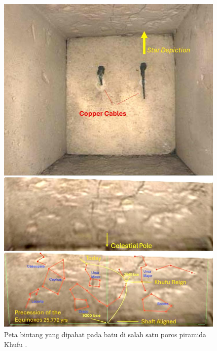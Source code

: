 \documentclass[10pt,twocolumn,letterpaper]{article}
\begin{document}
\begin{figure}[H]
\begin{center}
   \includegraphics[width=1\linewidth]{star-stone.jpg}
\end{center}
   \caption{Peta bintang yang dipahat pada batu di salah satu poros piramida Khufu \cite{28}.}
\label{fig:20}
\label{fig:onecol}
\end{figure}
\end{document}
